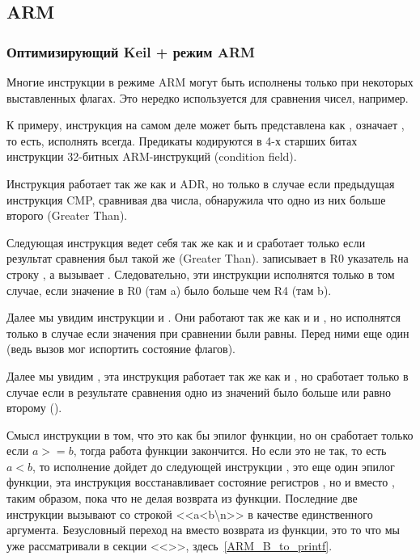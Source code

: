 ﻿%
\subsection{ARM}

\subsubsection{Оптимизирующий Keil + режим ARM}



Многие инструкции в режиме ARM могут быть исполнены только при некоторых выставленных флагах.
Это нередко используется для сравнения чисел, например.

К примеру, инструкция  на самом деле может быть представлена как ,  означает 
, то есть, исполнять всегда. Предикаты кодируются в 4-х старших битах инструкции 32-битных ARM-инструкций
(condition field).

Инструкция  работает так же как и ADR, но только в случае если предыдущая инструкция CMP,
сравнивая два числа, обнаружила что одно из них больше второго (Greater Than).

Следующая инструкция  ведет себя так же как и  и сработает только если 
результат сравнения был такой же (Greater Than).  записывает в R0 указатель на строку 
,
а  вызывает \printf. Следовательно, эти инструкции исполнятся только в том случае, если значение
в R0 (там a) было больше чем R4 (там b). 

Далее мы увидим инструкции  и . Они работают так же как и  и , 
но исполнятся только в случае если
значения при сравнении были равны. Перед ними еще один \CMP (ведь вызов \printf мог испортить состояние флагов).

Далее мы увидим , эта инструкция работает так же как и , но сработает только в случае если 
в результате сравнения одно из значений было больше или равно второму ().

Смысл инструкции  в том, что это как бы эпилог функции, но он сработает только
если $a>=b$, тогда работа функции закончится. 
Но если это не так, то есть $a<b$, то исполнение дойдет до следующей инструкции 
, это еще один эпилог функции, эта инструкция восстанавливает состояние регистров
, но и \LR вместо \PC, таким образом, пока что не делая возврата из функции. 
Последние две инструкции вызывают
\printf со строкой <<a<b\textbackslash{}n>> в качестве единственного аргумента. Безусловный переход на \printf вместо возврата
из функции, это то что мы уже рассматривали в секции <<\PrintfSeveralArgumentsSectionName>>, 
здесь~\ref{ARM_B_to_printf}.

